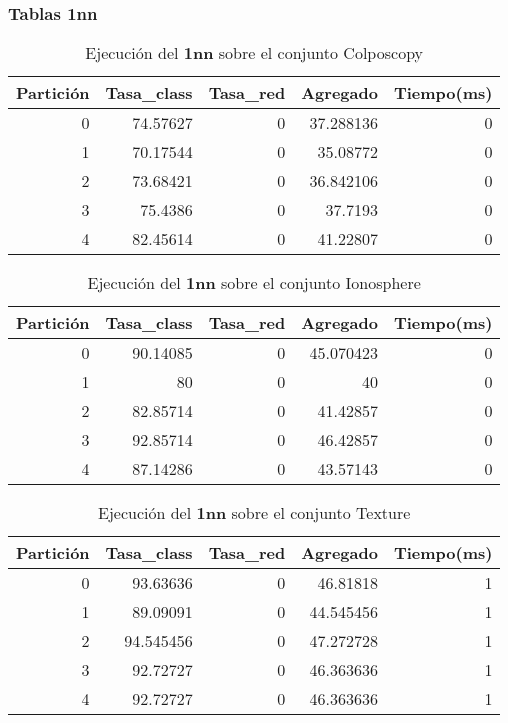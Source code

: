 \documentclass[size=a4, parskip=half, titlepage=false, toc=flat, toc=bib, 12pt]{scrartcl}
\begin{document}
\newpage
\subsubsection{Tablas 1nn}

 \begin{table}[ht]
  \centering
  \begin{tabular}[t]{rrrrr}
  \toprule
  Partición &Tasa\_class &Tasa\_red & Agregado & Tiempo(ms)\\
  \midrule
0         & 74.57627  & 0        & 37.288136 & 0      \\
1         & 70.17544  & 0        & 35.08772  & 0      \\
2         & 73.68421  & 0        & 36.842106 & 0      \\
3         & 75.4386   & 0        & 37.7193   & 0      \\
4         & 82.45614  & 0        & 41.22807  & 0      \\
  \bottomrule
  \end{tabular}
  \caption{Ejecución del \textbf{1nn} sobre el conjunto Colposcopy }
  \end{table}%

 \begin{table}[ht]
  \centering
  \begin{tabular}[t]{rrrrr}
  \toprule
  Partición &Tasa\_class &Tasa\_red & Agregado & Tiempo(ms)\\
  \midrule
0         & 90.14085  & 0        & 45.070423 & 0      \\
1         & 80        & 0        & 40        & 0      \\
2         & 82.85714  & 0        & 41.42857  & 0      \\
3         & 92.85714  & 0        & 46.42857  & 0      \\
4         & 87.14286  & 0        & 43.57143  & 0      \\
  \bottomrule
  \end{tabular}
  \caption{Ejecución del \textbf{1nn} sobre el conjunto Ionosphere}
  \end{table}%

 \begin{table}[ht]
  \centering
  \begin{tabular}[t]{rrrrr}
  \toprule
  Partición &Tasa\_class &Tasa\_red & Agregado & Tiempo(ms)\\
  \midrule
0         & 93.63636  & 0        & 46.81818  & 1      \\
1         & 89.09091  & 0        & 44.545456 & 1      \\
2         & 94.545456 & 0        & 47.272728 & 1      \\
3         & 92.72727  & 0        & 46.363636 & 1      \\
4         & 92.72727  & 0        & 46.363636 & 1      \\
  \bottomrule
  \end{tabular}
  \caption{Ejecución del \textbf{1nn} sobre el conjunto Texture}
  \end{table}%
\end{document}
